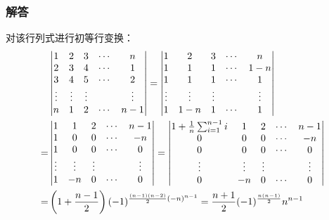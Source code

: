 \documentclass[9pt,xcolor=svgnames]{beamer} %
\begin{document}
\begin{frame}
    \frametitle{解答}
    对该行列式进行初等行变换：
    \begin{align*}
          &
        \begin{vmatrix}
            1      & 2      & 3      & \cdots & n      \\
            2      & 3      & 4      & \cdots & 1      \\
            3      & 4      & 5      & \cdots & 2      \\
            \vdots & \vdots & \vdots &        & \vdots \\
            n      & 1      & 2      & \cdots & n-1
        \end{vmatrix}=
        \begin{vmatrix}
            1      & 2      & 3      & \cdots & n      \\
            1      & 1      & 1      & \cdots & 1-n    \\
            1      & 1      & 1      & \cdots & 1      \\
            \vdots & \vdots & \vdots &        & \vdots \\
            1      & 1-n    & 1      & \cdots & 1
        \end{vmatrix}                                                                  \\
        = &
        \begin{vmatrix}
            1      & 1      & 2      & \cdots & n-1    \\
            1      & 0      & 0      & \cdots & -n     \\
            1      & 0      & 0      & \cdots & 0      \\
            \vdots & \vdots & \vdots &        & \vdots \\
            1      & -n     & 0      & \cdots & 0
        \end{vmatrix}=
        \begin{vmatrix}
            1+\frac{1}{n}\sum_{i=1}^{n-1}i & 1      & 2      & \cdots & n-1    \\
            0                              & 0      & 0      & \cdots & -n     \\
            0                              & 0      & 0      & \cdots & 0      \\
            \vdots                         & \vdots & \vdots &        & \vdots \\
            0                              & -n     & 0      & \cdots & 0
        \end{vmatrix}                                          \\
        = & \left( 1+\frac{n-1}{2} \right)(-1)^{\frac{(n-1)(n-2)}{2}(-n)^{n-1}}=\frac{n+1}{2}(-1)^{\frac{n(n-1)}{2}}n^{n-1}
    \end{align*}
\end{frame}
\end{document}
